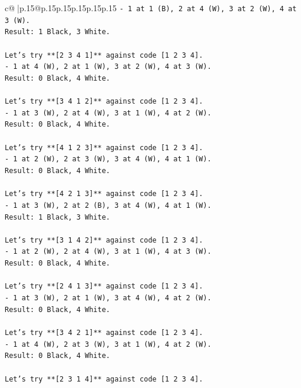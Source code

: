 \documentclass{article}
\begin{document}
{\begin{supertabular}{c@{$\;$}|p{.15\linewidth}@{}p{.15\linewidth}p{.15\linewidth}p{.15\linewidth}p{.15\linewidth}p{.15\linewidth}}
{{{\texttt{{-} 1 at 1 (B), 2 at 4 (W), 3 at 2 (W), 4 at 3 (W).} \\
\texttt{Result: 1 Black, 3 White.} \\
\\ 
\texttt{Let's try **{[}2 3 4 1{]}** against code {[}1 2 3 4{]}.} \\
\texttt{{-} 1 at 4 (W), 2 at 1 (W), 3 at 2 (W), 4 at 3 (W).} \\
\texttt{Result: 0 Black, 4 White.} \\
\\ 
\texttt{Let's try **{[}3 4 1 2{]}** against code {[}1 2 3 4{]}.} \\
\texttt{{-} 1 at 3 (W), 2 at 4 (W), 3 at 1 (W), 4 at 2 (W).} \\
\texttt{Result: 0 Black, 4 White.} \\
\\ 
\texttt{Let's try **{[}4 1 2 3{]}** against code {[}1 2 3 4{]}.} \\
\texttt{{-} 1 at 2 (W), 2 at 3 (W), 3 at 4 (W), 4 at 1 (W).} \\
\texttt{Result: 0 Black, 4 White.} \\
\\ 
\texttt{Let's try **{[}4 2 1 3{]}** against code {[}1 2 3 4{]}.} \\
\texttt{{-} 1 at 3 (W), 2 at 2 (B), 3 at 4 (W), 4 at 1 (W).} \\
\texttt{Result: 1 Black, 3 White.} \\
\\ 
\texttt{Let's try **{[}3 1 4 2{]}** against code {[}1 2 3 4{]}.} \\
\texttt{{-} 1 at 2 (W), 2 at 4 (W), 3 at 1 (W), 4 at 3 (W).} \\
\texttt{Result: 0 Black, 4 White.} \\
\\ 
\texttt{Let's try **{[}2 4 1 3{]}** against code {[}1 2 3 4{]}.} \\
\texttt{{-} 1 at 3 (W), 2 at 1 (W), 3 at 4 (W), 4 at 2 (W).} \\
\texttt{Result: 0 Black, 4 White.} \\
\\ 
\texttt{Let's try **{[}3 4 2 1{]}** against code {[}1 2 3 4{]}.} \\
\texttt{{-} 1 at 4 (W), 2 at 3 (W), 3 at 1 (W), 4 at 2 (W).} \\
\texttt{Result: 0 Black, 4 White.} \\
\\ 
\texttt{Let's try **{[}2 3 1 4{]}** against code {[}1 2 3 4{]}.} \\
}}}
\end{supertabular}}
\end{document}
